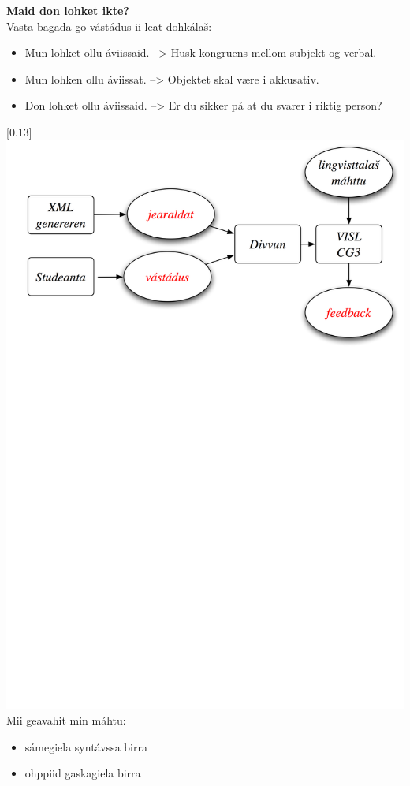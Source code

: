 \documentclass[landscape,norsk,11pt]{seminar}
\begin{document}
\begin{slide}
\newslide
\textbf{Maid don lohket ikte?}\\
Vasta bagada go vástádus ii leat dohkálaš:
\begin{itemize}
\item Mun lohket ollu \'aviissaid. --> Husk kongruens mellom subjekt og verbal.
\item Mun lohken ollu \'aviissat. --> Objektet skal være i akkusativ.
\item Don lohket ollu \'aviissaid. --> Er du sikker på at du svarer i riktig person?
\end{itemize}

\newslide
\scalebox{0.13}[0.13]{\includegraphics{img/skovi.png}} 
\newslide
Mii geavahit min máhtu:
\begin{itemize}
\item sámegiela syntávssa birra		
\item ohppiid gaskagiela birra
\end{itemize}



\end{slide}
\end{document}
